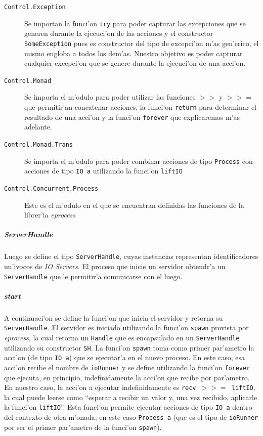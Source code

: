 \documentclass[a4paper]{article}
\begin{document}
\begin{description}
	\item[\texttt{Control.Exception}] Se importan la funci'on \texttt{try} para poder capturar las excepciones que se generen durante la ejecuci'on de las acciones y el constructor \texttt{SomeException} pues es constructor del tipo de excepci'on m'as gen'erico, el mismo engloba a todos los dem'as.  Nuestro objetivo es poder capturar cualquier excepci'on que se genere durante la ejecuci'on de una acci'on.
	\item[\texttt{Control.Monad}] Se importa el m'odulo para poder utilizar las funciones \texttt{$>>$} y \texttt{$>>=$} que permitir'an concatenar acciones, la funci'on \texttt{return} para determinar el resultado de una acci'on y la funci'on \texttt{forever} que explicaremos m'as adelante.
	\item[\texttt{Control.Monad.Trans}] Se importa el m'odulo para poder combinar acciones de tipo \texttt{Process} con acciones de tipo \texttt{IO a} utilizando la funci'on \texttt{liftIO}
	\item[\texttt{Control.Concurrent.Process}] Este es el m'odulo en el que se encuentran definidas las funciones de la librer'ia \textsl{eprocess}
\end{description}
\subparagraph{ServerHandle}Luego se define el tipo \texttt{ServerHandle}, cuyas instancias representan identificadores un'ivocos de \textsl{IO Servers}.  El proceso que inicie un servidor obtendr'a un \texttt{ServerHandle} que le permitir'a comunicarse con el luego.
\subparagraph{start}A continuaci'on se define la funci'on que inicia el servidor y retorna su \texttt{ServerHandle}.  El servidor es iniciado utilizando la funci'on \texttt{spawn} provista por \textsl{eprocess}, la cual retorna un \texttt{Handle} que es encapsulado en un \texttt{ServerHandle} utilizando su constructor \texttt{SH}.  La funci'on \texttt{spawn} toma como primer par'ametro la acci'on (de tipo \texttt{IO a}) que se ejecutar'a en el nuevo proceso.  En este caso, esa acci'on recibe el nombre de \texttt{ioRunner} y se define utilizando la funci'on \texttt{forever} que ejecuta, en principio, indefinidamente la acci'on que recibe por par'ametro.  En nuestro caso, la acci'on a ejecutar indefinidamente es \texttt{recv $>>=$ liftIO}, la cual puede leerse como ``esperar a recibir un valor y, una vez recibido, aplicarle la funci'on \texttt{liftIO}''.  Esta funci'on permite ejecutar acciones de tipo \texttt{IO a} dentro del contexto de otra m'onada, en este caso \texttt{Process a} (que es el tipo de \texttt{ioRunner} por ser el primer par'ametro de la funci'on \texttt{spawn}).
\end{document}
